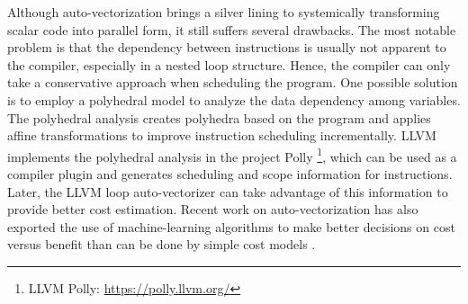 Although auto-vectorization brings a silver lining to systemically transforming
scalar code into parallel form, it still suffers several drawbacks. The most
notable problem is that the dependency between instructions is usually not
apparent to the compiler, especially in a nested loop structure. Hence, the
compiler can only take a conservative approach when scheduling the program. One
possible solution is to employ a polyhedral model \cite{polyhedral} to analyze
the data dependency among variables. The polyhedral analysis creates polyhedra
based on the program and applies affine transformations to improve instruction
scheduling incrementally. LLVM implements the polyhedral analysis in the
project Polly \cite{polly} \footnote{LLVM Polly: \url{https://polly.llvm.org/}},
which can be used as a compiler plugin and generates scheduling and scope
information for instructions. Later, the LLVM loop auto-vectorizer can take
advantage of this information to provide better cost estimation. Recent work on
auto-vectorization has also exported the use of machine-learning algorithms
to make better decisions on cost versus benefit than can be done by simple cost
models \cite{ml-vectorization}.